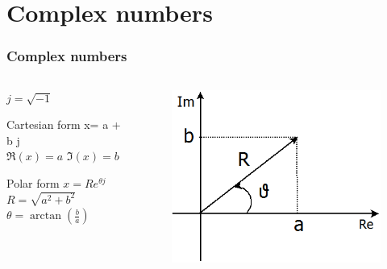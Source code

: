 \section{Complex numbers}

\begin{frame}
\frametitle{Complex numbers}
\begin{columns}
	\begin{column}{0.5\textwidth}
		\begin{definition}
			$j = \sqrt{-1}$
		\end{definition}
		\begin{block}{Cartesian form}
			x= a + b j\\
			$\Re(x) = a$ \quad $\Im(x) = b$
		\end{block}
		\begin{block}{Polar form}
			$x = Re^{\theta j}$\\
			$R = \sqrt{a^2+b^2}$ \qquad $\theta = \arctan(\frac{b}{a})$
		\end{block}
	\end{column}
	\begin{column}{0.5\textwidth}
		\begin{figure}
			\centering
			\includegraphics[width=1\linewidth]{Images/afbeelding_4}
		\end{figure}

	\end{column}
\end{columns}

\end{frame}

